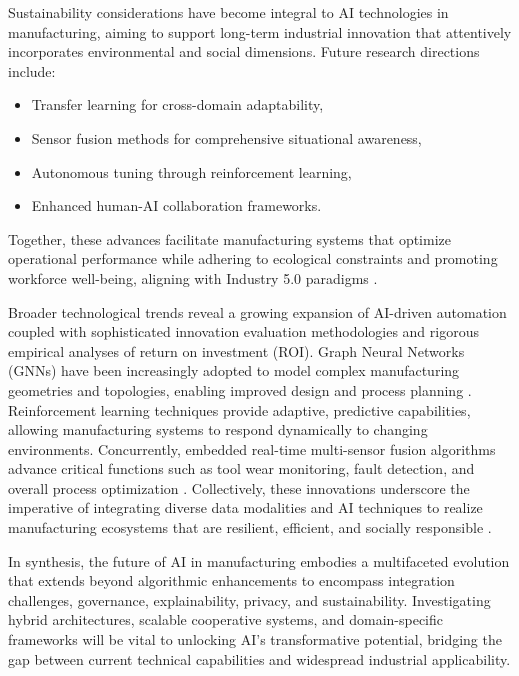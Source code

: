 \documentclass[sigconf]{acmart}
\begin{document}
Sustainability considerations have become integral to AI technologies in manufacturing, aiming to support long-term industrial innovation that attentively incorporates environmental and social dimensions. Future research directions include:
\begin{itemize}
    \item Transfer learning for cross-domain adaptability,
    \item Sensor fusion methods for comprehensive situational awareness,
    \item Autonomous tuning through reinforcement learning,
    \item Enhanced human-AI collaboration frameworks.
\end{itemize}
Together, these advances facilitate manufacturing systems that optimize operational performance while adhering to ecological constraints and promoting workforce well-being, aligning with Industry 5.0 paradigms \cite{ref5,ref7,ref44}.

Broader technological trends reveal a growing expansion of AI-driven automation coupled with sophisticated innovation evaluation methodologies and rigorous empirical analyses of return on investment (ROI). Graph Neural Networks (GNNs) have been increasingly adopted to model complex manufacturing geometries and topologies, enabling improved design and process planning \cite{ref31}. Reinforcement learning techniques provide adaptive, predictive capabilities, allowing manufacturing systems to respond dynamically to changing environments. Concurrently, embedded real-time multi-sensor fusion algorithms advance critical functions such as tool wear monitoring, fault detection, and overall process optimization \cite{ref34,ref39}. Collectively, these innovations underscore the imperative of integrating diverse data modalities and AI techniques to realize manufacturing ecosystems that are resilient, efficient, and socially responsible \cite{ref9,ref33}.

In synthesis, the future of AI in manufacturing embodies a multifaceted evolution that extends beyond algorithmic enhancements to encompass integration challenges, governance, explainability, privacy, and sustainability. Investigating hybrid architectures, scalable cooperative systems, and domain-specific frameworks will be vital to unlocking AI’s transformative potential, bridging the gap between current technical capabilities and widespread industrial applicability.

\newpage  
  

\end{document}
